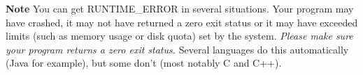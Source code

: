 \documentclass[a4paper]{artikel3}
\newcommand{\strong}[1]{\textbf{#1}}
\begin{document}
\strong{Note} You can get RUNTIME\_ERROR in several situations. Your program
may have crashed, it may not have returned a zero exit status or it may have
exceeded limits (such as memory usage or disk quota) set by the system.
\emph{Please make sure your program returns a zero exit status.} Several
languages do this automatically (Java for example), but some
don't (most notably C and C++).
\end{document}
